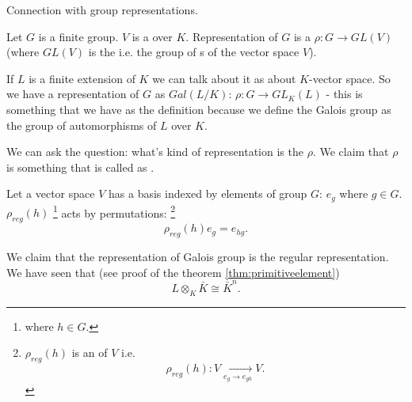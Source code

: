 Connection with group representations.
\begin{definition}
  Let $G$ is a finite group. $V$ is a  over
  $K$. Representation of $G$ is a 
  $\rho: G \to GL\left(V\right)$
  (where $GL\left(V\right)$ is the  i.e. the group of
  s of the vector space $V$).
  \label{def:grouprepresentation}
\end{definition}

If $L$ is a finite extension of $K$ we can talk about it as about
$K$-vector space. So we have a representation of $G$ as
 $Gal\left(L/K\right)$:
$\rho: G \to GL_K\left(L\right)$ - this is something that we have as
the definition because we define the Galois group as the group of
automorphisms of $L$ over $K$.

We can ask the question: what's kind of representation is the
$\rho$. We claim that $\rho$ is something that is called as
.
\begin{definition}
  Let a vector space $V$ has a basis indexed by elements of group $G$:
  $e_g$ where $g \in G$. $\rho_{reg}\left(h\right)$
  \footnote{
    where $h \in G$.
  }
  acts by
  permutations:
  \footnote{
    $\rho_{reg}\left(h\right)$ is an  of $V$
    i.e.
    \[
    \rho_{reg}\left(h\right): V \xrightarrow[e_g \to e_{gh}]{} V.
    \]
  }
  \[
  \rho_{reg}\left(h\right) e_g = e_{hg}.
  \]
  \label{def:regularrepresentation}
\end{definition}

We claim that the representation of Galois group is the regular
representation. We have seen that (see proof of the theorem
\ref{thm:primitiveelement}) 
\[
L \otimes_K \bar{K} \cong \bar{K}^n.
\]

